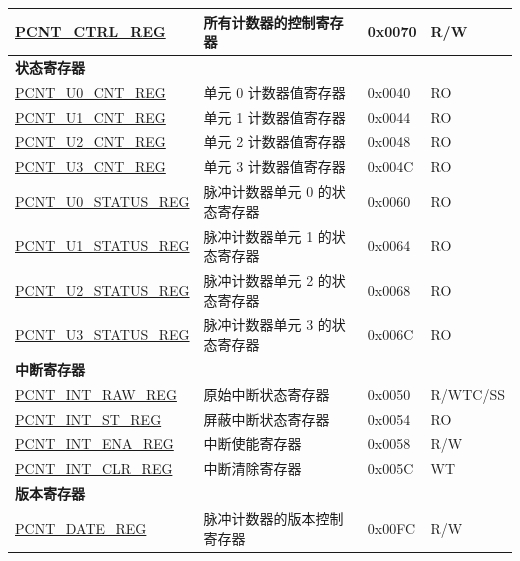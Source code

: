 \begin{longtable}{ | p{6cm} | p{7.2cm} | p{1.3cm} | p{1cm} | }
    \hyperref[regdesc:PCNTCTRLREG]{PCNT\_CTRL\_REG} & 所有计数器的控制寄存器 & 0x0070 & R/W \\ \hline
    \multicolumn{4}{|l|}{\textbf{状态寄存器}} \\ \hline
    \hyperref[regdesc:PCNTUNCNTREG]{PCNT\_U0\_CNT\_REG} & 单元 0 计数器值寄存器 & 0x0040 & RO \\ \hline
    \hyperref[regdesc:PCNTUNCNTREG]{PCNT\_U1\_CNT\_REG} & 单元 1 计数器值寄存器 & 0x0044 & RO \\ \hline
    \hyperref[regdesc:PCNTUNCNTREG]{PCNT\_U2\_CNT\_REG} & 单元 2 计数器值寄存器 & 0x0048 & RO \\ \hline
    \hyperref[regdesc:PCNTUNCNTREG]{PCNT\_U3\_CNT\_REG} & 单元 3 计数器值寄存器 & 0x004C & RO \\ \hline
    \hyperref[regdesc:PCNTUNSTATUSREG]{PCNT\_U0\_STATUS\_REG} & 脉冲计数器单元 0 的状态寄存器 & 0x0060 & RO \\ \hline
    \hyperref[regdesc:PCNTUNSTATUSREG]{PCNT\_U1\_STATUS\_REG} & 脉冲计数器单元 1 的状态寄存器 & 0x0064 & RO \\ \hline
    \hyperref[regdesc:PCNTUNSTATUSREG]{PCNT\_U2\_STATUS\_REG} & 脉冲计数器单元 2 的状态寄存器 & 0x0068 & RO \\ \hline
    \hyperref[regdesc:PCNTUNSTATUSREG]{PCNT\_U3\_STATUS\_REG} & 脉冲计数器单元 3 的状态寄存器 & 0x006C & RO \\ \hline
    \multicolumn{4}{|l|}{\textbf{中断寄存器}} \\ \hline
    \hyperref[regdesc:PCNTINTRAWREG]{PCNT\_INT\_RAW\_REG} & 原始中断状态寄存器 & 0x0050 & R/WTC/SS \\ \hline
    \hyperref[regdesc:PCNTINTSTREG]{PCNT\_INT\_ST\_REG} & 屏蔽中断状态寄存器 & 0x0054 & RO \\ \hline
    \hyperref[regdesc:PCNTINTENAREG]{PCNT\_INT\_ENA\_REG} & 中断使能寄存器 & 0x0058 & R/W \\ \hline
    \hyperref[regdesc:PCNTINTCLRREG]{PCNT\_INT\_CLR\_REG} & 中断清除寄存器 & 0x005C & WT \\ \hline
    \multicolumn{4}{|l|}{\textbf{版本寄存器}} \\ \hline
    \hyperref[regdesc:PCNTDATEREG]{PCNT\_DATE\_REG} & 脉冲计数器的版本控制寄存器 & 0x00FC & R/W \\ \hline
    \end{longtable}

